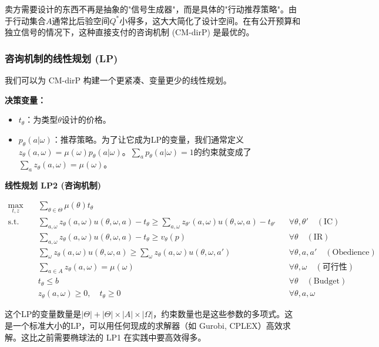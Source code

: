 卖方需要设计的东西不再是抽象的"信号生成器"，而是具体的"行动推荐策略"。由于行动集合$A$通常比后验空间$Q^*$小得多，这大大简化了设计空间。在有公开预算和独立信号的情况下，这种直接支付的咨询机制 (CM-dirP) 是最优的。

\subsubsection{咨询机制的线性规划 (LP)}

我们可以为 CM-dirP 构建一个更紧凑、变量更少的线性规划。

\textbf{决策变量：}
\begin{itemize}
    \item $t_\theta$：为类型$\theta$设计的价格。
    \item $p_\theta(a|\omega)$：推荐策略。为了让它成为LP的变量，我们通常定义$z_\theta(a,\omega)=\mu(\omega)p_\theta(a|\omega)$。$\sum\limits_{a}p_\theta(a|\omega)=1$的约束就变成了$\sum\limits_{a} z_\theta(a,\omega)=\mu(\omega)$。
\end{itemize}

\textbf{线性规划 LP2 (咨询机制)}

\begin{align*}
    \max_{t,z} \quad & \sum_{\theta \in \Theta} \mu(\theta) t_{\theta} \\
    \text{s.t.} \quad & \sum_{a, \omega} z_{\theta}(a, \omega) u(\theta, \omega, a) - t_{\theta} \geq \sum_{a, \omega} z_{\theta'}(a, \omega) u(\theta, \omega, a) - t_{\theta'} && \forall \theta, \theta' \quad (\text{IC}) \\
    & \sum_{a, \omega} z_{\theta}(a, \omega) u(\theta, \omega, a) - t_{\theta} \geq v_{\theta}(p) && \forall \theta \quad (\text{IR}) \\
    & \sum_{\omega} z_{\theta}(a, \omega) u(\theta, \omega, a) \geq \sum_{\omega} z_{\theta}(a, \omega) u(\theta, \omega, a') && \forall \theta, a, a' \quad (\text{Obedience}) \\
    & \sum_{a \in A} z_{\theta}(a, \omega) = \mu(\omega) && \forall \theta, \omega \quad (\text{可行性}) \\
    & t_{\theta} \leq b && \forall \theta \quad (\text{Budget}) \\
    & z_{\theta}(a, \omega) \geq 0, \quad t_{\theta} \geq 0 && \forall \theta, a, \omega
\end{align*}

这个LP的变量数量是$|\Theta|+|\Theta|\times |A|\times |\Omega|$，约束数量也是这些参数的多项式。这是一个标准大小的LP，可以用任何现成的求解器（如 Gurobi, CPLEX）高效求解。这比之前需要椭球法的 LP1 在实践中要高效得多。

